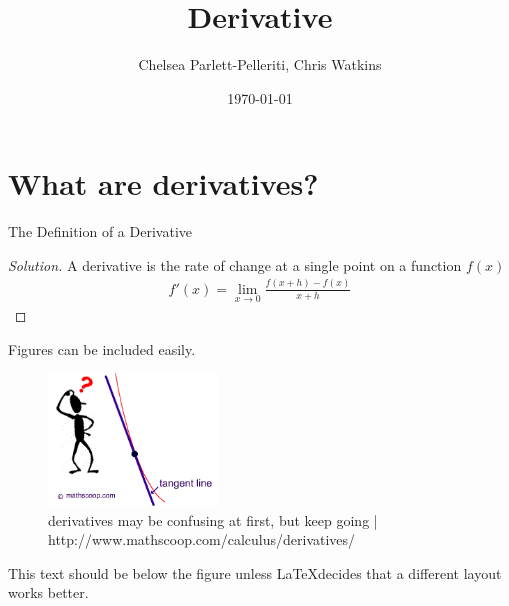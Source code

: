 \documentclass[aps,pra,notitlepage,amsmath,amssymb,letterpaper,12pt]{revtex4-1}
\newenvironment{problem}[2][Problem]{\begin{trivlist}
\item[\hskip \labelsep {\bfseries #1}\hskip \labelsep {\bfseries #2.}]}{\end{trivlist}}
\newenvironment{solution}{\begin{proof}[Solution]}{\end{proof}}
\begin{document}
 
\title{Derivative}
\author{Chelsea Parlett-Pelleriti, Chris Watkins}
\date{\today}

\maketitle

\section{What are derivatives?} %

\begin{problem}{1} 
The Definition of a Derivative
\end{problem}
 
\begin{solution} %
A derivative is the rate of change at a single point on a function $f(x)$ 
\begin{align}
f'(x) = \lim_{x \rightarrow 0} \frac{f(x+h)-f(x)}{x+h}
\end{align}
\end{solution}


Figures can be included easily.

\begin{figure}[h!] %
  \includegraphics[width=0.4\textwidth]{1.png}  %
  \caption{derivatives may be confusing at first, but keep going | http://www.mathscoop.com/calculus/derivatives/}
  \label{fig:figlabel}
\end{figure}

This text should be below the figure unless \LaTeX  decides that a different layout works better.
 
 
\end{document}
